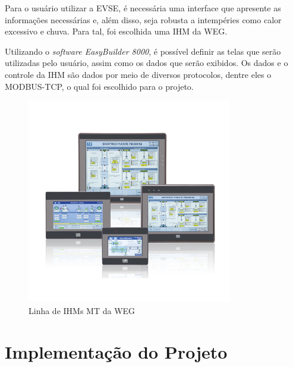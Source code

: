 Para o usuário utilizar a EVSE, é necessária uma interface que apresente as informações necessárias e, além disso, seja robusta a intempéries como calor excessivo e chuva. Para tal, foi escolhida uma \ac{IHM} da WEG.

Utilizando o \textit{software EasyBuilder 8000}, é possível definir as telas que serão utilizadas pelo usuário, assim como os dados que serão exibidos. Os dados e o controle da IHM são dados por meio de diversos protocolos, dentre eles o MODBUS-TCP, o qual foi escolhido para o projeto.

\begin{figure}[H]
        \begin{center}
                \includegraphics[width=0.8\textwidth,natwidth=400,natheight=288]{assets/images/devices-hmi.jpg}
                \caption{Linha de IHMs MT da WEG}
                \label{fig:bbb}
        \end{center}
\end{figure}

\section{Implementação do Projeto}

